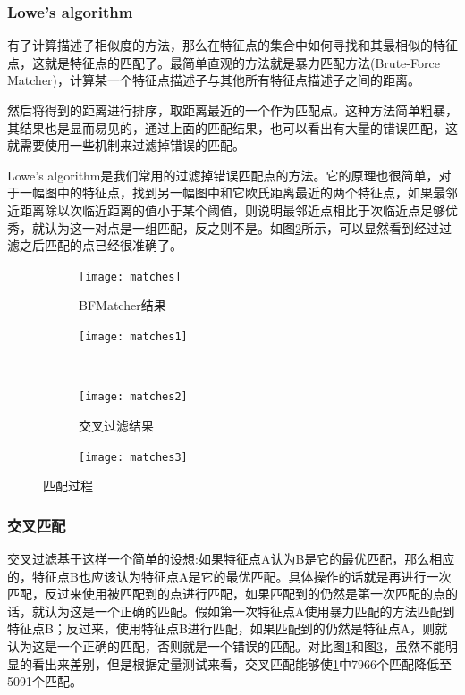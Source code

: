 \subsubsection{Lowe’s algorithm}
有了计算描述子相似度的方法，那么在特征点的集合中如何寻找和其最相似的特征点，这就是特征点的匹配了。最简单直观的方法就是暴力匹配方法(Brute-Force Matcher)，计算某一个特征点描述子与其他所有特征点描述子之间的距离。\par
然后将得到的距离进行排序，取距离最近的一个作为匹配点。这种方法简单粗暴，其结果也是显而易见的，通过上面的匹配结果，也可以看出有大量的错误匹配，这就需要使用一些机制来过滤掉错误的匹配。\par
Lowe's algorithm\cite{muja2009fast}是我们常用的过滤掉错误匹配点的方法。它的原理也很简单，对于一幅图中的特征点，找到另一幅图中和它欧氏距离最近的两个特征点，如果最邻近距离除以次临近距离的值小于某个阈值，则说明最邻近点相比于次临近点足够优秀，就认为这一对点是一组匹配，反之则不是。如图\ref{lowe's filter}所示，可以显然看到经过过滤之后匹配的点已经很准确了。
\begin{figure}[H]
	\centering
	\begin{subfigure}[ht]{0.4\textwidth}
		\centering
		\texttt{[image: matches]}
		\caption{BFMatcher结果}
		\label{no filter}
	\end{subfigure}
	\quad
	\begin{subfigure}[ht]{0.4\textwidth}
		\centering
		\texttt{[image: matches1]}
		\label{lowe's filter}
	\end{subfigure}\\
	\begin{subfigure}[ht]{0.4\textwidth}
		\centering
		\texttt{[image: matches2]}
		\caption{交叉过滤结果}
		\label{crosscheck filter}
	\end{subfigure}
	\quad
	\begin{subfigure}[ht]{0.4\textwidth}
		\centering
		\texttt{[image: matches3]}
		\label{RANSAC filter}
	\end{subfigure}
	\caption{匹配过程}
	\label{filters}
\end{figure}
\subsubsection{交叉匹配}
交叉过滤基于这样一个简单的设想:如果特征点A认为B是它的最优匹配，那么相应的，特征点B也应该认为特征点A是它的最优匹配。具体操作的话就是再进行一次匹配，反过来使用被匹配到的点进行匹配，如果匹配到的仍然是第一次匹配的点的话，就认为这是一个正确的匹配。假如第一次特征点A使用暴力匹配的方法匹配到特征点B；反过来，使用特征点B进行匹配，如果匹配到的仍然是特征点A，则就认为这是一个正确的匹配，否则就是一个错误的匹配。对比图\ref{no filter}和图\ref{crosscheck filter}，虽然不能明显的看出来差别，但是根据定量测试来看，交叉匹配能够使\ref{no filter}中7966个匹配降低至5091个匹配。
